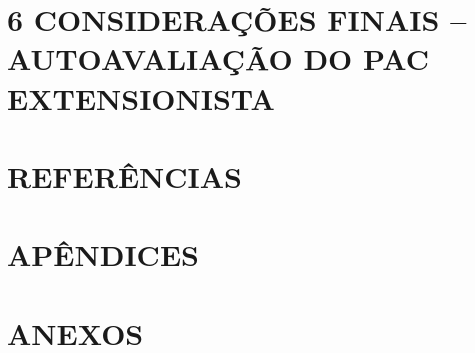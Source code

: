 \documentclass[12pt, a4paper]{article}
\begin{document}
\newpage
{}
\label{sec:consideracoes}
\section*{6 CONSIDERA\c{C}\~OES FINAIS -- AUTOAVALIA\c{C}\~AO DO PAC EXTENSIONISTA}
 
\newpage
{}
\label{sec:referencias}
\section*{REFER\^ENCIAS}

 
\newpage
{}
\label{sec:apendices}
\section*{AP\^ENDICES}
 
\newpage
{}
\label{sec:anexos}
\section*{ANEXOS}
 
\end{document}
